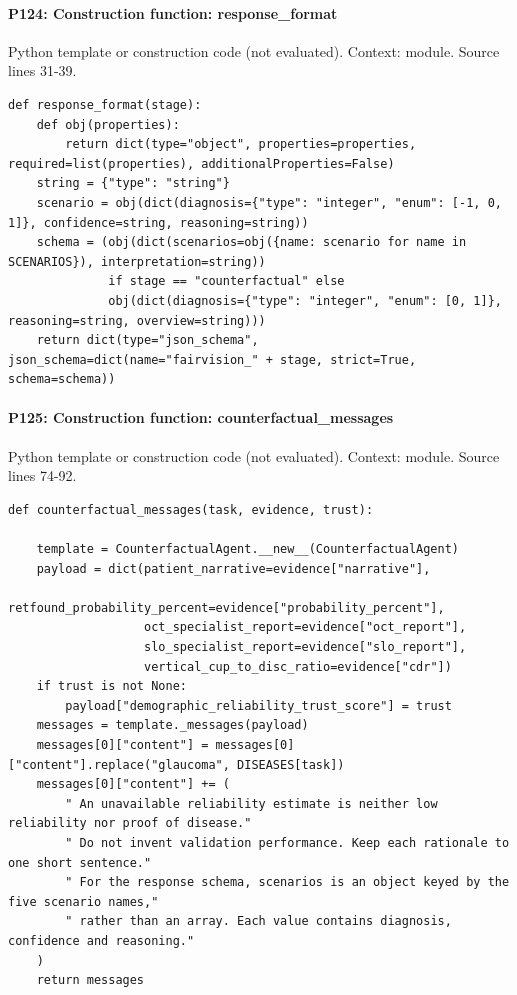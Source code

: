 \documentclass[10pt]{article}
\begin{document}
\paragraph{P124: Construction function: response\_format}
Python template or construction code (not evaluated). Context: module. Source lines 31-39.
\begin{Verbatim}
def response_format(stage):
    def obj(properties):
        return dict(type="object", properties=properties, required=list(properties), additionalProperties=False)
    string = {"type": "string"}
    scenario = obj(dict(diagnosis={"type": "integer", "enum": [-1, 0, 1]}, confidence=string, reasoning=string))
    schema = (obj(dict(scenarios=obj({name: scenario for name in SCENARIOS}), interpretation=string))
              if stage == "counterfactual" else
              obj(dict(diagnosis={"type": "integer", "enum": [0, 1]}, reasoning=string, overview=string)))
    return dict(type="json_schema", json_schema=dict(name="fairvision_" + stage, strict=True, schema=schema))
\end{Verbatim}
\paragraph{P125: Construction function: counterfactual\_messages}
Python template or construction code (not evaluated). Context: module. Source lines 74-92.
\begin{Verbatim}
def counterfactual_messages(task, evidence, trust):

    template = CounterfactualAgent.__new__(CounterfactualAgent)
    payload = dict(patient_narrative=evidence["narrative"],
                   retfound_probability_percent=evidence["probability_percent"],
                   oct_specialist_report=evidence["oct_report"],
                   slo_specialist_report=evidence["slo_report"],
                   vertical_cup_to_disc_ratio=evidence["cdr"])
    if trust is not None:
        payload["demographic_reliability_trust_score"] = trust
    messages = template._messages(payload)
    messages[0]["content"] = messages[0]["content"].replace("glaucoma", DISEASES[task])
    messages[0]["content"] += (
        " An unavailable reliability estimate is neither low reliability nor proof of disease."
        " Do not invent validation performance. Keep each rationale to one short sentence."
        " For the response schema, scenarios is an object keyed by the five scenario names,"
        " rather than an array. Each value contains diagnosis, confidence and reasoning."
    )
    return messages
\end{Verbatim}
\end{document}
